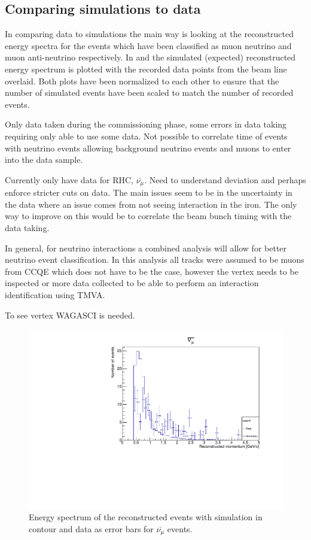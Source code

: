 \pagebreak
\newpage
\FloatBarrier
\subsection{Comparing simulations to data}
In comparing data to simulations the main way is looking at the reconstructed energy spectra for the events which have been classified as muon neutrino and muon anti-neutrino respectively. In  and  the simulated (expected) reconstructed energy spectrum is plotted with the recorded data points from the beam line overlaid. Both plots have been normalized to each other to ensure that the number of simulated events have been scaled to match the number of recorded events.

Only data taken during the commissioning phase, some errors in data taking requiring only able to use some data. Not possible to correlate time of events with neutrino events allowing background neutrino events and muons to enter into the data sample.

Currently only have data for RHC, $\bar{\nu_{\mu}}$. Need to understand deviation and perhaps enforce stricter cuts on data. The main issues seem to be in the uncertainty in the data where an issue comes from not seeing interaction in the iron. The only way to improve on this would be to correlate the beam bunch timing with the data taking. 

In general, for neutrino interactions a combined analysis will allow for better neutrino event classification. In this analysis all tracks were assumed to be muons from CCQE which does not have to be the case, however the vertex needs to be inspected or more data collected to be able to perform an interaction identification using TMVA. 

To see vertex WAGASCI is needed.




\begin{figure}[h!]
\centering
\includegraphics[width=.9\textwidth]{figures/NeutrinoChap/nuBarEventNew.pdf}
\caption{Energy spectrum of the reconstructed events with simulation in contour and data as error bars for $\bar{\nu_\mu}$ events.}
\label{fig:datanumubar}
\end{figure}


